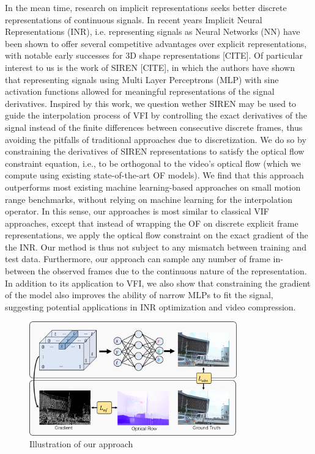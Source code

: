 \documentclass{article}
\begin{document}
In the mean time, research on implicit representations seeks better discrete representations of continuous signals.
In recent years Implicit Neural Representations (INR), i.e. representing signals as Neural Networks (NN)
have been shown to offer several competitive advantages over explicit representations,
with notable early successes for 3D shape representations [CITE].
Of particular interest to us is the work of SIREN [CITE],
in which the authors have shown that representing
signals using Multi Layer Perceptrons (MLP) with sine activation functions
allowed for meaningful representations of the signal derivatives.
Inspired by this work, we question wether SIREN may be used to guide the interpolation
process of VFI by controlling the exact derivatives of the signal instead of the finite differences
between consecutive discrete frames, thus avoiding the pitfalls of traditional approaches due to discretization.
We do so by constraining the derivatives of SIREN representations to satisfy the optical flow constraint equation,
i.e., to be orthogonal to the video's optical flow
(which we compute using existing state-of-the-art OF models).
We find that this approach outperforms most existing
machine learning-based approaches on small motion range benchmarks,
without relying on machine learning for the interpolation operator.
In this sense, our approaches is most similar to classical VIF approaches,
except that instead of wrapping the OF on discrete explicit frame representations,
we apply the optical flow constraint on the exact gradient of the the INR.
Our method is thus not subject to any mismatch between training and test data.
Furthermore, our approach can sample any number of frame in-between the observed frames
due to the continuous nature of the representation.
In addition to its application to VFI, we also show that constraining the gradient
of the model also improves the ability of narrow MLPs to fit the signal,
suggesting potential applications in INR optimization and video compression.

\begin{figure}[h]
\centering
\includegraphics[width=0.8\textwidth]{Method}
\caption{Illustration of our approach}
\end{figure}
\end{document}
